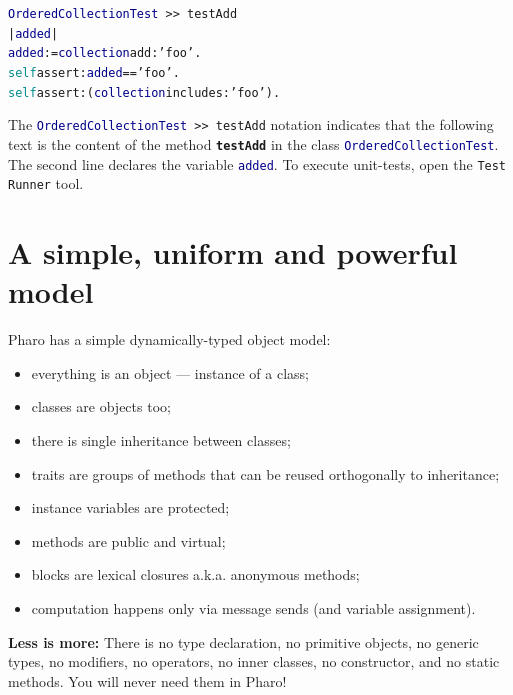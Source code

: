 \documentclass[notumble]{leaflet}
\makeatletter
\newenvironment{displaycode}{%
     \par
     \hspace{1.5em}\begin{minipage}{\linewidth}
       \begin{alltt}\small}{
       \end{alltt}
     \end{minipage}
     \par}
\newcommand{\code}[1]{\foreignlanguage{english}{\texttt{#1}}}
\makeatother
\begin{document}
\begin{displaycode}
\textcolor{darkBlue}{OrderedCollectionTest}\,>>\,testAdd
  | \textcolor{darkBlue}{added} |
  \textcolor{darkBlue}{added} := \textcolor{darkBlue}{collection} add: \textcolor{string}{'foo'}.
  \textcolor{darkCyan}{self} assert: \textcolor{darkBlue}{added} == \textcolor{string}{'foo'}.
  \textcolor{darkCyan}{self} assert: (\textcolor{darkBlue}{collection} includes: \textcolor{string}{'foo'}).
\end{displaycode}

The \code{\textcolor{darkBlue}{OrderedCollectionTest}\,>{}>\,testAdd}
notation indicates that the following text is the content of the
method \code{\textbf{testAdd}} in the class
\code{\textcolor{darkBlue}{OrderedCollectionTest}}. The second line
declares the variable \code{\textcolor{darkBlue}{added}}. To execute
unit-tests, open the \code{Test Runner} tool.



\section{A simple, uniform and powerful model}

Pharo has a simple dynamically-typed object model:

\begin{itemize}
\item everything is an object --- instance of a class;
\item classes are objects too;
\item there is single inheritance between classes;
\item traits are groups of methods that can be reused orthogonally to inheritance;
\item instance variables are protected;
\item methods are public and virtual;
\item blocks are lexical closures a.k.a. anonymous methods;
\item computation happens only via message sends (and variable assignment).
\end{itemize}

\textbf{Less is more:} There is no type declaration, no primitive
objects, no generic types, no modifiers, no operators, no inner
classes, no constructor, and no static methods. You will never need them in
Pharo!







\vfill{}
\end{document}
